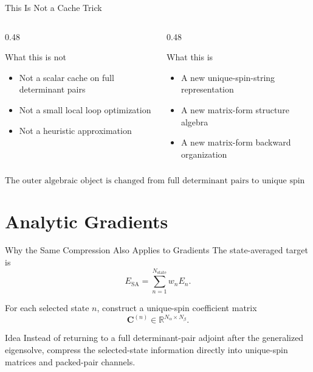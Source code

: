 \documentclass{beamer}
\newcommand{\Na}{N_{\alpha}}
\newcommand{\Nb}{N_{\beta}}
\newcommand{\Nstate}{N_{\mathrm{state}}}
\newcommand{\Cmat}{\mathbf{C}}
\begin{document}
\begin{frame}{This Is Not a Cache Trick}
  \begin{columns}[T]
    \begin{column}{0.48\textwidth}
      \begin{block}{What this is not}
        \begin{itemize}
          \item Not a scalar cache on full determinant pairs
          \item Not a small local loop optimization
          \item Not a heuristic approximation
        \end{itemize}
      \end{block}
    \end{column}
    \begin{column}{0.48\textwidth}
      \begin{block}{What this is}
        \begin{itemize}
          \item A new unique-spin-string representation
          \item A new matrix-form structure algebra
          \item A new matrix-form backward organization
        \end{itemize}
      \end{block}
    \end{column}
  \end{columns}

  \vspace{0.6em}
  \[
  \boxed{
  \text{The outer algebraic object is changed from full determinant pairs to
  unique spin spaces.}
  }
  \]
\end{frame}

\section{Analytic Gradients}

\begin{frame}{Why the Same Compression Also Applies to Gradients}
  The state-averaged target is
  \[
  E_{\mathrm{SA}} = \sum_{n=1}^{\Nstate} w_n E_n.
  \]

  For each selected state $n$, construct a unique-spin coefficient matrix
  \[
  \Cmat^{(n)} \in \mathbb{R}^{\Na\times\Nb}.
  \]

  \begin{block}{Idea}
    Instead of returning to a full determinant-pair adjoint after the
    generalized eigensolve, compress the selected-state information directly
    into unique-spin matrices and packed-pair channels.
  \end{block}
\end{frame}
\end{document}
